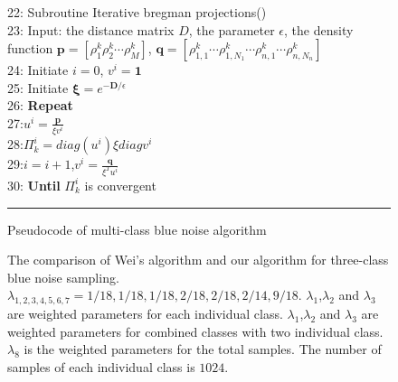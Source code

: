\begin{figure}[htb]
22: Subroutine Iterative bregman projections()\\
23: Input: the distance matrix $D$, the parameter $\epsilon$,
    the density function $\mathbf{p}=[\rho_1^k \rho_2^k \cdots \rho_M^k]$,
    $\mathbf{q}=[\rho_{1,1}^k \cdots \rho_{1,N_1}^k \cdots \rho_{n,1}^k \cdots \rho_{n,N_n}^k]$\\
24: Initiate $i=0$, $v^i=\mathbf{1}$\\
25: Initiate $\mathbf\xi=e^{-\mathbf{D}/\epsilon}$\\
26: \textbf{Repeat}\\
27:\quad $u^i=\frac{\mathbf{p}}{\xi v^i}$\\
28:\quad $\Pi_k^i=diag(u^i)\xi diag{v^i}$\\
29:\quad $i=i+1$,$v^i=\frac{\mathbf{q}}{\xi^Tu^i}$\\
30: \textbf{Until} $\Pi_k^i$ is convergent\\
\rule{0.47\textwidth}{0.5pt}
  \caption{Pseudocode of multi-class blue noise algorithm}\label{}
\end{figure}



\begin{figure*}[htb]
  \centering
  \caption{The comparison of Wei's algorithm and our algorithm for three-class blue noise sampling.
  $\lambda_{1,2,3,4,5,6,7}=1/18,1/18,1/18,2/18,2/18,2/14,9/18$.
  $\lambda_1$,$\lambda_2$ and $\lambda_3$ are weighted parameters for each individual class.
  $\lambda_1$,$\lambda_2$ and $\lambda_3$ are weighted parameters for combined classes with two individual class.
  $\lambda_8$ is the weighted parameters for the total samples.
  The number of samples of each individual class is $1024$.}
  \label{three-class-sampling}
\end{figure*}
